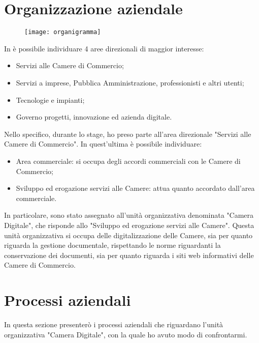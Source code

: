 \section{Organizzazione aziendale}
\label{sec:organizzazione_aziendale}

	\begin{figure}[htbp]
		\begin{center}
			\texttt{[image: organigramma]}
		\end{center}
	\end{figure}

	In \nomeAzienda è possibile individuare 4 aree direzionali di maggior interesse:
	\begin{itemize}
		\item{Servizi alle Camere di Commercio;}
		\item{Servizi a imprese, Pubblica Amministrazione, professionisti e altri utenti;}
		\item{Tecnologie e impianti;}
		\item{Governo progetti, innovazione ed azienda digitale.}
	\end{itemize}

	Nello specifico, durante lo stage, ho preso parte all'area direzionale "Servizi alle Camere di Commercio". In quest'ultima è possibile individuare:
	\begin{itemize}
		\item{Area commerciale: si occupa degli accordi commerciali con le Camere di Commercio;}
		\item{Sviluppo ed erogazione servizi alle Camere: attua quanto accordato dall'area commerciale.}
	\end{itemize}

	In particolare, sono stato assegnato all'unità organizzativa denominata "Camera Digitale", che risponde allo "Sviluppo ed erogazione servizi alle Camere". Questa unità organizzativa si occupa delle digitalizzazione delle Camere, sia per quanto riguarda la gestione documentale, rispettando le norme riguardanti la conservazione dei documenti, sia per quanto riguarda i siti web informativi delle Camere di Commercio.

\section{Processi aziendali}
\label{sec:processi_aziendali}
In questa sezione presenterò i processi aziendali che riguardano l'unità organizzativa "Camera Digitale", con la quale ho avuto modo di confrontarmi.

